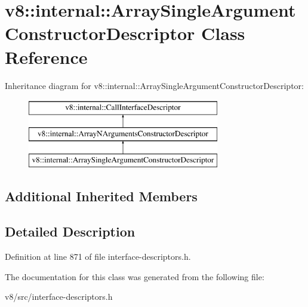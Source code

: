 \hypertarget{classv8_1_1internal_1_1ArraySingleArgumentConstructorDescriptor}{}\section{v8\+:\+:internal\+:\+:Array\+Single\+Argument\+Constructor\+Descriptor Class Reference}
\label{classv8_1_1internal_1_1ArraySingleArgumentConstructorDescriptor}
Inheritance diagram for v8\+:\+:internal\+:\+:Array\+Single\+Argument\+Constructor\+Descriptor\+:\begin{figure}[H]
\begin{center}
\leavevmode
\includegraphics[height=3.000000cm]{classv8_1_1internal_1_1ArraySingleArgumentConstructorDescriptor}
\end{center}
\end{figure}
\subsection*{Additional Inherited Members}


\subsection{Detailed Description}


Definition at line 871 of file interface-\/descriptors.\+h.



The documentation for this class was generated from the following file\+:\begin{DoxyCompactItemize}
\item 
v8/src/interface-\/descriptors.\+h\end{DoxyCompactItemize}

